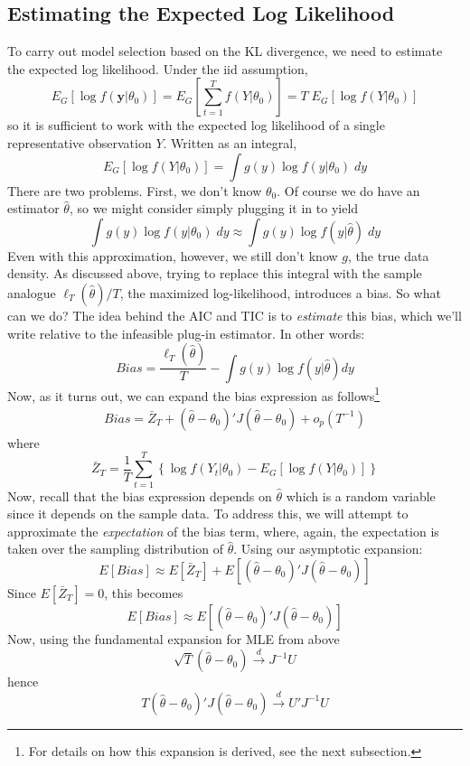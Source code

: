 \documentclass[12pt]{article}
\theoremstyle{definition}
\begin{document}
\subsection{Estimating the Expected Log Likelihood}
To carry out model selection based on the KL divergence, we need to estimate the expected log likelihood. Under the iid assumption,
	$$E_G[\log f(\mathbf{y}|\theta_0)] = E_G\left[\sum_{t=1}^T f(Y|\theta_0) \right] = T \; E_G[\log f(Y|\theta_0)]$$
so it is sufficient to work with the expected log likelihood of a single representative observation $Y$. Written as an integral,
	$$E_G[\log f(Y|\theta_0)] = \int g(y) \log f(y|\theta_0) \; dy$$
There are two problems. First, we don't know $\theta_0$. Of course we do have an estimator $\widehat{\theta}$, so we might consider simply plugging it in to yield
$$\int g(y) \log f(y|\theta_0) \; dy \approx \int g(y) \log f(y|\widehat{\theta}) \; dy$$
Even with this approximation, however, we still don't know $g$, the true data density. As discussed above, trying to replace this integral with the sample analogue $\ell_T(\widehat{\theta})/T$, the maximized log-likelihood, introduces a bias. So what can we do? The idea behind the AIC and TIC is to \emph{estimate} this bias, which we'll write relative to the infeasible plug-in estimator. In other words:
$$Bias = \frac{\ell_T(\widehat{\theta})}{T} - \int g(y) \log f(y|\widehat{\theta}) dy$$
Now, as it turns out, we can expand the bias expression as follows\footnote{For details on how this expansion is derived, see the next subsection.}
\begin{eqnarray*}
	Bias = \bar{Z}_T + (\widehat{\theta} - \theta_0)' J (\widehat{\theta} - \theta_0) + o_p(T^{-1})
\end{eqnarray*}
where
$$\bar{Z}_T = \frac{1}{T} \sum_{t=1}^T\left\{ \log f(Y_t|\theta_0) - E_G[\log f(Y|\theta_0)] \right\}$$
Now, recall that the bias expression depends on $\widehat{\theta}$ which is a random variable since it depends on the sample data. To address this, we will attempt to approximate the \emph{expectation} of the bias term, where, again, the expectation is taken over the sampling distribution of $\widehat{\theta}$. Using our asymptotic expansion:
	$$E[Bias] \approx E[\bar{Z}_T] + E[(\widehat{\theta} - \theta_0)' J (\widehat{\theta} - \theta_0)]$$
Since $E[\bar{Z}_T] = 0$, this becomes
$$E[Bias] \approx E[(\widehat{\theta} - \theta_0)' J (\widehat{\theta} - \theta_0)]$$
Now, using the fundamental expansion for MLE from above
$$\sqrt{T}\left(\widehat{\theta} - \theta_0 \right) \overset{d}{\rightarrow} J^{-1}U$$
hence
	$$T\left(\widehat{\theta} - \theta_0 \right)'J\left(\widehat{\theta} - \theta_0 \right) \overset{d}{\rightarrow} U' J^{-1} U$$
\end{document}
